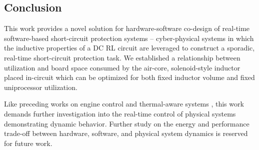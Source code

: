 \clearpage \subsection{Conclusion} \label{subsec:conclusion}
This work provides a novel solution for hardware-software co-design of real-time software-based short-circuit protection systems -- cyber-physical systems in which the inductive properties of a DC RL circuit are leveraged to construct a sporadic, real-time short-circuit protection task. We established a relationship between utilization and board space consumed by the air-core, solenoid-style inductor placed in-circuit which can be optimized for both fixed inductor volume and fixed uniprocessor utilization.

Like preceding works on engine control \cite{engineCtrl} and thermal-aware systems \cite{thermalAware}, this work demands further investigation into the real-time control of physical systems demonstrating dynamic behavior. Further study on the energy and performance trade-off between hardware, software, and physical system dynamics is reserved for future work.









